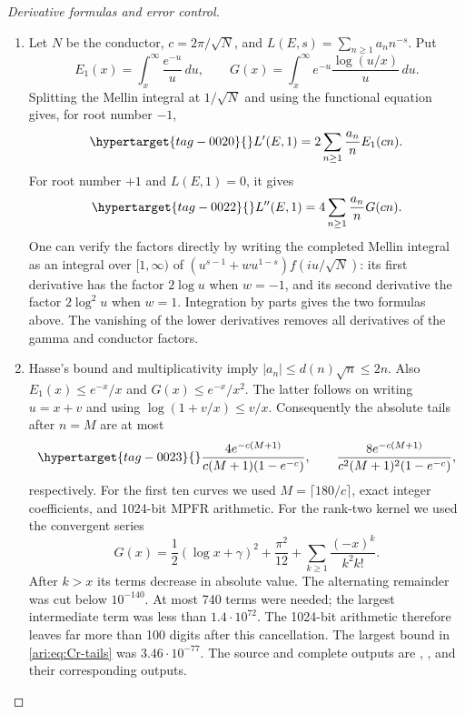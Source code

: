\begin{proof}[Derivative formulas and error control]

\begin{enumerate}[label=\arabic*.,leftmargin=*]
\item Let $N$ be the conductor, $c=2\pi/\sqrt N$, and
$L(E,s)=\sum_{n\geq1}a_nn^{-s}$. Put
\[
 E_1(x)=\int_x^\infty\frac{e^{-u}}u\,du,
 \qquad G(x)=\int_x^\infty e^{-u}\frac{\log(u/x)}u\,du.
\]
Splitting the Mellin integral at $1/\sqrt N$ and using the functional
equation gives, for root number $-1$,
\begin{equation}\hypertarget{tag-0020}{}\label{ari:eq:Cr-first}
 L'(E,1)=2\sum_{n\geq1}\frac{a_n}{n}E_1(cn).
\end{equation}
For root number $+1$ and $L(E,1)=0$, it gives
\begin{equation}\hypertarget{tag-0022}{}\label{ari:eq:Cr-second}
 L''(E,1)=4\sum_{n\geq1}\frac{a_n}{n}G(cn).
\end{equation}
One can verify the factors directly by writing the completed Mellin
integral as an integral over $[1,\infty)$ of
$(u^{s-1}+wu^{1-s})f(iu/\sqrt N)$: its first derivative has
the factor $2\log u$ when $w=-1$, and its second derivative
the factor $2\log^2u$ when $w=1$. Integration by parts gives
the two formulas above. The vanishing of the lower derivatives
removes all derivatives of the gamma and conductor factors.

\item Hasse's bound and multiplicativity imply
$|a_n|\leq d(n)\sqrt n\leq2n$. Also
$E_1(x)\leq e^{-x}/x$ and $G(x)\leq e^{-x}/x^2$.
The latter follows on writing $u=x+v$ and using
$\log(1+v/x)\leq v/x$. Consequently the absolute tails after
$n=M$ are at most
\begin{equation}\hypertarget{tag-0023}{}\label{ari:eq:Cr-tails}
 \frac{4e^{-c(M+1)}}{c(M+1)(1-e^{-c})},\qquad
 \frac{8e^{-c(M+1)}}{c^2(M+1)^2(1-e^{-c})},
\end{equation}
respectively. For the first ten curves we used
$M=\lceil180/c\rceil$, exact integer coefficients, and 1024-bit
MPFR arithmetic. For the rank-two kernel we used the convergent series
\[
 G(x)=\frac12(\log x+\gamma)^2+\frac{\pi^2}{12}
       +\sum_{k\geq1}\frac{(-x)^k}{k^2k!}.
\]
After $k>x$ its terms decrease in absolute value. The alternating
remainder was cut below $10^{-140}$. At most 740 terms were needed;
the largest intermediate term was less than $1.4\cdot10^{72}$.
The 1024-bit arithmetic therefore leaves far more than 100 digits
after this cancellation. The largest bound in
\eqref{ari:eq:Cr-tails} was $3.46\cdot10^{-77}$. The source and complete
outputs are ,
, and their corresponding outputs.


\end{enumerate}
\end{proof}
